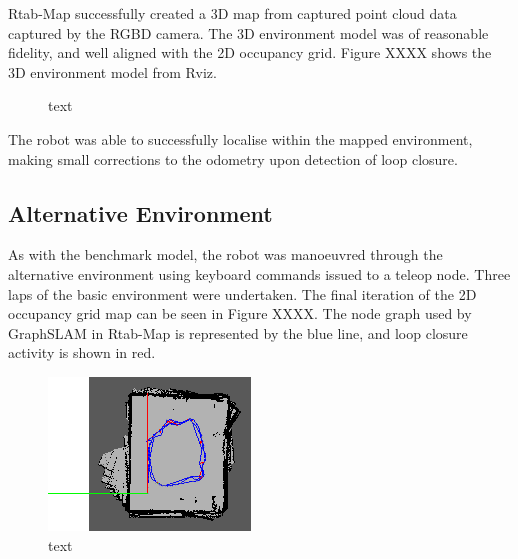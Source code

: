\documentclass[a4paper]{article}
\begin{document}
Rtab-Map successfully created a 3D map from captured point cloud data captured by the RGBD camera. The 3D environment model was of reasonable fidelity, and well aligned with the 2D occupancy grid. Figure XXXX shows the 3D environment model from Rviz.
\begin{figure}[h]
\centering
{}
\caption{text}
\end{figure}

The robot was able to successfully localise within the mapped environment, making small corrections to the odometry upon detection of loop closure.


\subsection{Alternative Environment}
As with the benchmark model, the robot was manoeuvred through the alternative environment using keyboard commands issued to a teleop node. Three laps of the basic environment were undertaken. The final iteration of the 2D occupancy grid map can be seen in Figure XXXX. The node graph used by GraphSLAM in Rtab-Map is represented by the blue line, and loop closure activity is shown in red.
\begin{figure}[h]
\centering
\includegraphics[scale=1.2]{slam_house_2_graph_view}
\caption{text}
\end{figure}
\end{document}
